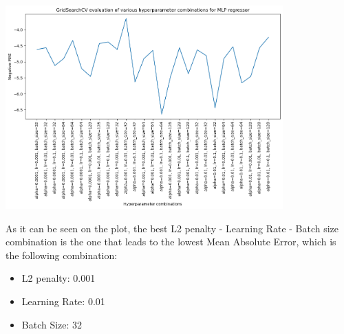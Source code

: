 \documentclass[12pt]{article}
\begin{document}
\begin{enumerate}[leftmargin=\labelsep, label=\textbf{\arabic*.)},start=5]
          \begin{center}
              \includegraphics[width=0.8\textwidth]{hyperparameters_performance_plot.png}
          \end{center}

          As it can be seen on the plot, the best L2 penalty - Learning Rate - Batch size combination is the one that leads to the lowest Mean Absolute Error, which is the following combination:

          \begin{itemize}
              \item L2 penalty: 0.001
              \item Learning Rate: 0.01
              \item Batch Size: 32
          \end{itemize}


\end{enumerate}
\end{document}
